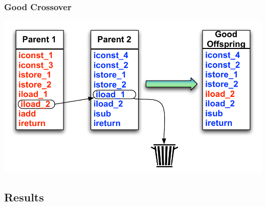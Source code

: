 \documentclass{beamer}
\begin{document}
\begin{frame}
  \frametitle{Good Crossover}
  \includegraphics[height=.5\textheight]{Illustrations/goodCrossover.pdf}
\end{frame}



\subsection[Results]{Results}
\end{document}
